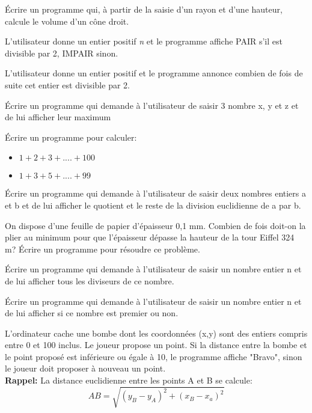 \documentclass[a4paper,11pt]{article}
\begin{document}
\begin{Form}
\begin{exo}
Écrire un programme qui, à partir de la saisie d'un rayon et d'une hauteur, calcule le volume d'un cône droit.
\end{exo}
\begin{exo}
L'utilisateur donne un entier positif \emph{n} et le programme affiche PAIR s'il est divisible par 2, IMPAIR sinon.
\end{exo}
\begin{exo}
L'utilisateur donne un entier positif et le programme annonce combien de fois de suite cet entier est divisible par 2.
\end{exo}
\begin{exo}
Écrire un programme qui demande à l’utilisateur de saisir 3 nombre x, y et z et de lui afficher leur maximum
\end{exo}
\begin{exo}
Écrire un programme pour calculer:
\begin{itemize}
\item $1+2+3+....+100$
\item $1+3+5+....+99$
\end{itemize}
\end{exo}
\begin{exo}
Écrire un programme qui demande à l’utilisateur de saisir deux nombres entiers a et b et de lui afficher le quotient et le reste de la division euclidienne de a par b.
\end{exo}
\begin{exo}
On dispose d'une feuille de papier d'épaisseur 0,1 mm.
Combien de fois doit-on la plier au minimum pour que l'épaisseur dépasse la hauteur de la tour Eiffel 324 m?
Écrire un programme pour résoudre ce problème. 
\end{exo}
\begin{exo}
Écrire un programme qui demande à l’utilisateur de saisir un nombre entier n et de lui afficher tous les diviseurs de ce nombre.
\end{exo}
\begin{exo}
Écrire un programme qui demande à l’utilisateur de saisir un nombre entier n et de lui afficher si ce nombre est premier ou non.
\end{exo}
\begin{exo}
L'ordinateur cache une bombe dont les coordonnées (x,y) sont des entiers compris entre 0 et 100 inclus.
Le joueur propose un point. Si la distance entre la bombe et le point proposé est inférieure ou égale à 10, le programme affiche "Bravo", sinon le joueur doit proposer à nouveau un point.\\
\textbf{Rappel:} La distance euclidienne entre les points A et B se calcule:
$$AB = \sqrt{(y_B-y_A)^2+(x_B-x_a)^2}$$
\end{exo}
\end{Form}
\end{document}
